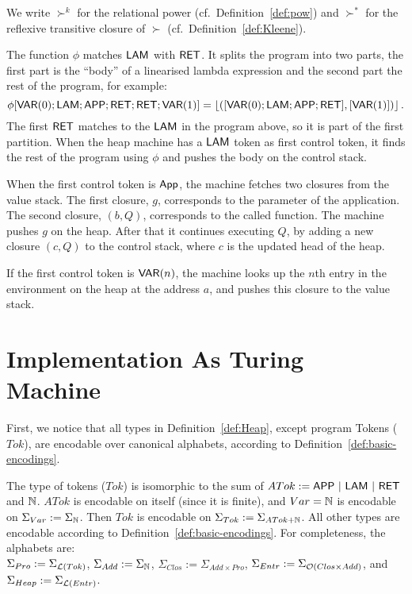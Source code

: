 We write $\succ^k$ for the relational power (cf.\ Definition~\ref{def:pow}) and $\succ^*$ for the reflexive transitive closure of $\succ$ (cf.\
Definition~\ref{def:Kleene}).

The function $\phi$ matches $\mathsf{LAM}$ with $\mathsf{RET}$.  It splits the program into two parts, the first part is the ``body'' of a linearised lambda
expression and the second part the rest of the program, for example:%
{\small
  \[
    \phi[\mathsf{VAR}(0); \mathsf{LAM}; \mathsf{APP}; \mathsf{RET}; \mathsf{RET}; \mathsf{VAR}(1)] = \left\lfloor {([\ensuremath{\mathsf{VAR}}(0); \ensuremath{\mathsf{LAM}}; \ensuremath{\mathsf{APP}}; \ensuremath{\mathsf{RET}}], [\ensuremath{\mathsf{VAR}}(1)])} \right\rfloor.
  \]
}%
The first $\mathsf{RET}$ matches to the $\mathsf{LAM}$ in the program above, so it is part of the first partition.  When the heap machine has a $\mathsf{LAM}$
token as first control token, it finds the rest of the program using $\phi$ and pushes the body on the control stack.

When the first control token is $\mathsf{App}$, the machine fetches two closures from the value stack.  The first closure, $g$, corresponds to the
parameter of the application.  The second closure, $(b,Q)$, corresponds to the called function.  The machine pushes $g$ on the heap.  After that it
continues executing $Q$, by adding a new closure $(c,Q)$ to the control stack, where $c$ is the updated head of the heap.

If the first control token is $\mathsf{VAR}(n)$, the machine looks up the $n$th entry in the environment on the heap at the address $a$, and pushes this
closure to the value stack.


\section{Implementation As Turing Machine}
\label{sec:heap-implementation}

First, we notice that all types in Definition~\ref{def:Heap}, except program Tokens ($Tok$), are encodable over canonical alphabets, according to
Definition~\ref{def:basic-encodings}.
\begin{definition}
  \label{def:Heap-encode}
  The type of tokens ($Tok$) is isomorphic to the sum of $ATok := \mathsf{APP} ~|~ \mathsf{LAM} ~|~ \mathsf{RET}$ and $\mathbb{N}$.  $ATok$ is encodable on itself
  (since it is finite), and $Var = \mathbb{N}$ is encodable on $\Sigma_{Var} := \Sigma_{\mathbb{N}}$.  Then $Tok$ is encodable on
  $\Sigma_{Tok} := \Sigma_{ATok+\mathbb{N}}$.  All other types are encodable according to Definition~\ref{def:basic-encodings}.
  For completeness, the alphabets are:\\
  $\Sigma_{Pro} := \Sigma_{\mathcal{L}(Tok)}$, $\Sigma_{Add} := \Sigma_{\mathbb{N}}$, $\Sigma_{Clos}:=\Sigma_{Add \times Pro}$,
  $\Sigma_{Entr} := \Sigma_{\mathcal{O}(Clos \times Add)}$, and $\Sigma_{Heap} := \Sigma_{\mathcal{L}(Entr)}$.
\end{definition}

